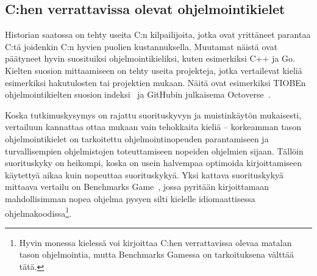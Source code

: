 % 

\subsection{C:hen verrattavissa olevat ohjelmointikielet}

Historian saatossa on tehty useita C:n kilpailijoita, jotka ovat yrittäneet
parantaa C:tä joidenkin C:n hyvien puolien kustannuksella. Muutamat näistä ovat
päätyneet hyvin suosituiksi ohjelmointikieliksi, kuten esimerkiksi C++ ja Go.
Kielten suosion mittaamiseen on tehty useita projekteja, jotka vertailevat
kieliä esimerkiksi hakutulosten tai projektien mukaan. Näitä ovat esimerkiksi
TIOBEn ohjelmointikielten suosion indeksi~\citep{tiobe} ja GitHubin julkaisema
Octoverse~\citep{octoverse}.%

Koska tutkimuskysymys on rajattu suorituskyvyn ja muistinkäytön mukaisesti,
vertailuun kannattaa ottaa mukaan vain tehokkaita kieliä -- korkeamman tason
ohjelmointikielet on tarkoitettu ohjelmointinopeuden parantamiseen ja
turvallisempien ohjelmistojen toteuttamiseen nopeiden ohjelmien sijaan. Tällöin
suorituskyky on heikompi, koska on usein halvempaa optimoida kirjoittamiseen
käytettyä aikaa kuin nopeuttaa suorituskykyä\citationneeded. Yksi kattava
suorituskykyä mittaava vertailu on Benchmarks Game~\citep{benchmarks}, jossa
pyritään kirjoittamaan mahdollisimman nopea ohjelma pysyen silti kielelle
idiomaattisessa ohjelmakoodissa\footnote{Hyvin monessa kielessä voi kirjoittaa
C:hen verrattavissa olevaa matalan tason ohjelmointia, mutta Benchmarks Gamessa
on tarkoituksena välttää tätä.}.

